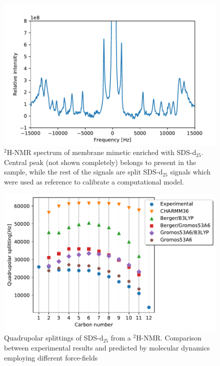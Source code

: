 \documentclass[twoside,twocolumn,9pt]{article}
\begin{document}
\begin{figure}[h]
  \centering
  \includegraphics[width=\columnwidth]{nmr_reference}
  \caption{$^2$H-NMR spectrum of membrane mimetic enriched with SDS-d$_{25}$.
    Central peak (not shown completely) belongs to  present in the
    sample, while the rest of the signals are split SDS-d$_{25}$ signals which
    were used as reference to calibrate a computational model.}
  \label{fig:reference}
\end{figure}
\begin{figure}[h]
\centering
  \includegraphics[width=\columnwidth]{calibration}
  \caption{Quadrupolar splittings of SDS-d$_{25}$ from a $^2$H-NMR. Comparison
    between experimental results and predicted by molecular dynamics employing
    different force-fields}
  \label{fig:calibration}
\end{figure}
\end{document}
